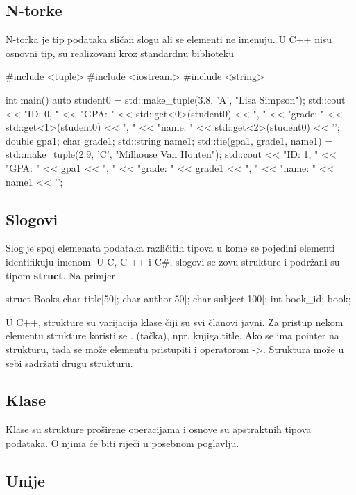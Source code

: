\documentclass[11pt]{book}
\begin{document}
\subsection{N-torke}  %
N-torka je tip podataka sličan slogu ali se elementi ne imenuju. U C++ nisu osnovni tip, su realizovani kroz standardnu biblioteku

\begin{shortlisting}
  #include <tuple>
  #include <iostream>
  #include <string>

  int main()
    {
      auto student0 = std::make_tuple(3.8, 'A', "Lisa Simpson");
      std::cout << "ID: 0, "
      << "GPA: " << std::get<0>(student0) << ", "
      << "grade: " << std::get<1>(student0) << ", "
      << "name: " << std::get<2>(student0) << '\n';
      double gpa1;
      char grade1;
      std::string name1;
      std::tie(gpa1, grade1, name1) = std::make_tuple(2.9, 'C', "Milhouse Van Houten");
      std::cout << "ID: 1, "
      << "GPA: " << gpa1 << ", "
      << "grade: " << grade1 << ", "
      << "name: " << name1 << '\n';
    }
\end{shortlisting}

\subsection{Slogovi}
Slog  je  spoj  elemenata  podataka  različitih  tipova  u  kome  se  pojedini  elementi identifikuju imenom. U C, C ++ i C\#, slogovi se zovu strukture i podržani su tipom \textbf{struct}. Na primjer

\begin{shortlisting}
  struct Books {
      char title[50];
      char author[50];
      char subject[100];
      int book_id;
    } book;
\end{shortlisting}

U  C++,  strukture  su  varijacija  klase  čiji  su  svi  članovi  javni.  Za  pristup  nekom  elementu strukture koristi se . (tačka), npr. knjiga.title. Ako se ima pointer na strukturu, tada se može elementu pristupiti i operatorom ->. Struktura može u sebi sadržati drugu strukturu.

\subsection{Klase}
Klase su strukture proširene operacijama i osnove su apstraktnih tipova podataka. O njima će biti riječi u posebnom poglavlju.

\subsection{Unije}  %
\end{document}
